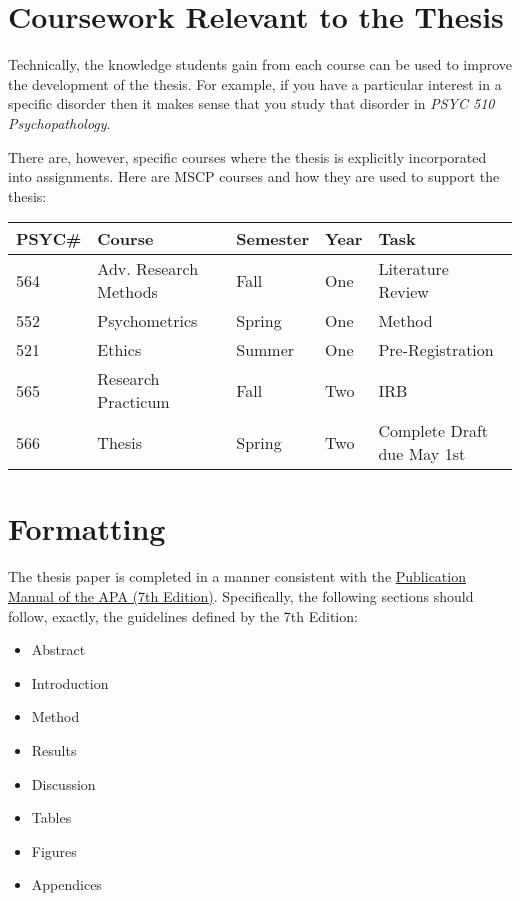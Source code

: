 \documentclass[openany]{book}
\providecommand{\tightlist}{%
  \setlength{\itemsep}{0pt}\setlength{\parskip}{0pt}}
\begin{document}
\hypertarget{coursework-relevant-to-the-thesis}{%
\chapter{Coursework Relevant to the Thesis}\label{coursework-relevant-to-the-thesis}}

Technically, the knowledge students gain from each course can be used to improve the development of the thesis. For example, if you have a particular interest in a specific disorder then it makes sense that you study that disorder in \emph{PSYC 510 Psychopathology}.

There are, however, specific courses where the thesis is explicitly incorporated into assignments. Here are MSCP courses and how they are used to support the thesis:

\begin{longtable}[]{@{}lllll@{}}
\toprule
PSYC\# & Course & Semester & Year & Task\tabularnewline
\midrule
\endhead
564 & Adv. Research Methods & Fall & One & Literature Review\tabularnewline
552 & Psychometrics & Spring & One & Method\tabularnewline
521 & Ethics & Summer & One & Pre-Registration\tabularnewline
565 & Research Practicum & Fall & Two & IRB\tabularnewline
566 & Thesis & Spring & Two & Complete Draft due May 1st\tabularnewline
\bottomrule
\end{longtable}

\hypertarget{formatting}{%
\chapter{Formatting}\label{formatting}}

The thesis paper is completed in a manner consistent with the \href{https://www.amazon.com/s?k=apa+publication+manual+7th+edition\&crid=7T10VJ2PYQZH\&sprefix=apa+pu\%2Caps\%2C261\&ref=nb_sb_ss_i_1_6}{Publication Manual of the APA (7th Edition)}. Specifically, the following sections should follow, exactly, the guidelines defined by the 7th Edition:

\begin{itemize}
\tightlist
\item
  Abstract
\item
  Introduction
\item
  Method
\item
  Results
\item
  Discussion
\item
  Tables
\item
  Figures
\item
  Appendices
\end{itemize}
\end{document}
